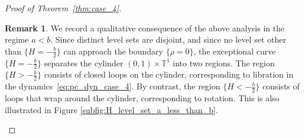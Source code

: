 \documentclass[10pt]{article}
\theoremstyle{definition}
\theoremstyle{definition}
\newtheorem{remark}[theorem]{Remark}
\numberwithin{equation}{section}
\newcommand{\BBT}{\mathbb{T}}
\begin{document}
\begin{proof}[Proof of Theorem~\ref{thm:case_4}]





\begin{remark}
We record a qualitative consequence of the above analysis in the regime $a < b$. 
Since distinct level sets are disjoint, and since no level set other than $\{H = -\frac{b}{2}\}$ can approach the boundary $\{\rho = 0\}$, the exceptional curve $\{H = -\frac{b}{2}\}$ separates the cylinder $(0,1) \times \BBT^1$ into two regions.  
The region $\{H > -\frac{b}{2}\}$ consists of closed loops on the cylinder, corresponding to libration in the dynamics~\eqref{eq:pc_dyn_case_4}.  
By contrast, the region $\{H < -\frac{b}{2}\}$ consists of loops that wrap around the cylinder, corresponding to rotation.
This is also illustrated in Figure \ref{subfig:H_level_set_a_less_than_b}.
\end{remark}


\end{proof}
\end{document}
